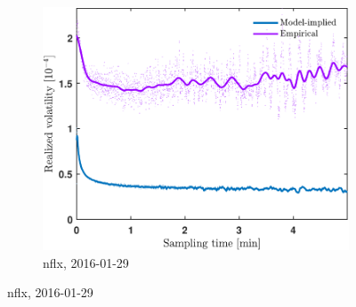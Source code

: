 \documentclass[11pt, a4paper]{thesis}  %
\begin{document}
\begin{figure}[H]
\begin{subfigure}[b]{0.3\textwidth}
        \label{figure:results:signature_plot:nflx:20160115}
    \end{subfigure}
    \hfill
    \begin{subfigure}[b]{0.3\textwidth}
        \centering
        \includegraphics[width=\textwidth]{./SignaturePlot/NFLX/20160129/signature_plot_predicted_vs_measured.pdf}
        \caption{\ac{nflx}, 2016-01-29}
        \label{figure:results:signature_plot:nflx:20160129}
    \end{subfigure}
    
    \vfill
    


\end{figure}
\end{document}
